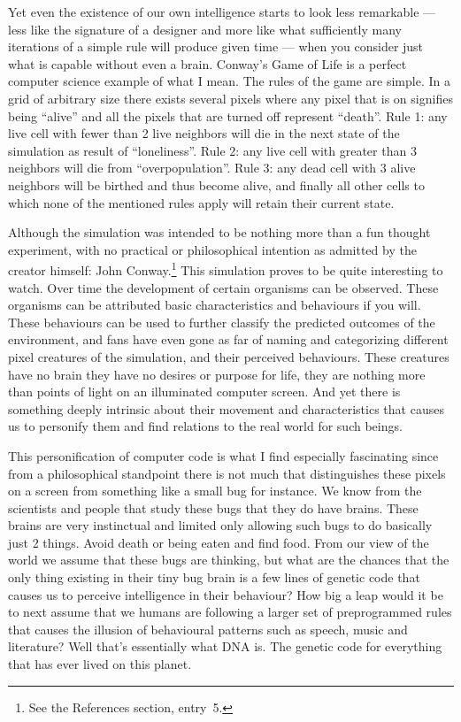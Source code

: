 Yet even the existence of our own intelligence starts to look less remarkable --- less like the
signature of a designer and more like what sufficiently many iterations of a simple rule will
produce given time --- when you consider just what is capable without even a brain. Conway's Game of Life
is a perfect computer science example of what I mean. The rules of the game are
simple. In a grid of arbitrary size there exists several pixels where any pixel that
is on signifies being ``alive'' and all the pixels that are turned off represent
``death''. Rule 1: any live cell with fewer than 2 live neighbors will die in the
next state of the simulation as result of ``loneliness''. Rule 2: any live cell with
greater than 3 neighbors will die from ``overpopulation''. Rule 3: any dead cell
with 3 alive neighbors will be birthed and thus become alive, and finally all other
cells to which none of the mentioned rules apply will retain their current state.

Although the simulation was intended to be nothing more than a fun thought
experiment, with no practical or philosophical intention as admitted by the creator
himself: John Conway.\footnote{See the References section, entry~5.} This simulation
proves to be quite interesting to watch. Over time the development of certain
organisms can be observed. These organisms can be attributed basic characteristics
and behaviours if you will. These behaviours can be used to further classify the
predicted outcomes of the environment, and fans have even gone as far of naming and
categorizing different pixel creatures of the simulation, and their perceived
behaviours. These creatures have no brain they have no desires or purpose for life,
they are nothing more than points of light on an illuminated computer screen. And
yet there is something deeply intrinsic about their movement and characteristics
that causes us to personify them and find relations to the real world for such
beings.

This personification of computer code is what I find especially fascinating since
from a philosophical standpoint there is not much that distinguishes these pixels on
a screen from something like a small bug for instance. We know from the scientists
and people that study these bugs that they do have brains. These brains are very
instinctual and limited only allowing such bugs to do basically just 2 things. Avoid
death or being eaten and find food. From our view of the world we assume that these
bugs are thinking, but what are the chances that the only thing existing in their
tiny bug brain is a few lines of genetic code that causes us to perceive
intelligence in their behaviour? How big a leap would it be to next assume that we
humans are following a larger set of preprogrammed rules that causes the illusion of
behavioural patterns such as speech, music and literature? Well that's essentially
what DNA is. The genetic code for everything that has ever lived on this planet.

